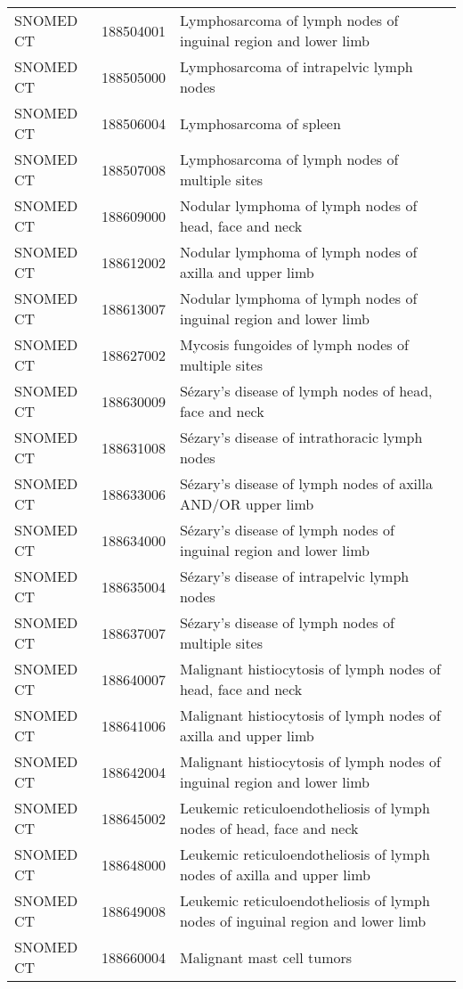 \begin{table}[ht]
\begin{tabular}{lll}
  SNOMED CT & 188504001 & Lymphosarcoma of lymph nodes of inguinal region and lower limb \\ 
  SNOMED CT & 188505000 & Lymphosarcoma of intrapelvic lymph nodes \\ 
  SNOMED CT & 188506004 & Lymphosarcoma of spleen \\ 
  SNOMED CT & 188507008 & Lymphosarcoma of lymph nodes of multiple sites \\ 
  SNOMED CT & 188609000 & Nodular lymphoma of lymph nodes of head, face and neck \\ 
  SNOMED CT & 188612002 & Nodular lymphoma of lymph nodes of axilla and upper limb \\ 
  SNOMED CT & 188613007 & Nodular lymphoma of lymph nodes of inguinal region and lower limb \\ 
  SNOMED CT & 188627002 & Mycosis fungoides of lymph nodes of multiple sites \\ 
  SNOMED CT & 188630009 & Sézary's disease of lymph nodes of head, face and neck \\ 
  SNOMED CT & 188631008 & Sézary's disease of intrathoracic lymph nodes \\ 
  SNOMED CT & 188633006 & Sézary's disease of lymph nodes of axilla AND/OR upper limb \\ 
  SNOMED CT & 188634000 & Sézary's disease of lymph nodes of inguinal region and lower limb \\ 
  SNOMED CT & 188635004 & Sézary's disease of intrapelvic lymph nodes \\ 
  SNOMED CT & 188637007 & Sézary's disease of lymph nodes of multiple sites \\ 
  SNOMED CT & 188640007 & Malignant histiocytosis of lymph nodes of head, face and neck \\ 
  SNOMED CT & 188641006 & Malignant histiocytosis of lymph nodes of axilla and upper limb \\ 
  SNOMED CT & 188642004 & Malignant histiocytosis of lymph nodes of inguinal region and lower limb \\ 
  SNOMED CT & 188645002 & Leukemic reticuloendotheliosis of lymph nodes of head, face and neck \\ 
  SNOMED CT & 188648000 & Leukemic reticuloendotheliosis of lymph nodes of axilla and upper limb \\ 
  SNOMED CT & 188649008 & Leukemic reticuloendotheliosis of lymph nodes of inguinal region and lower limb \\ 
  SNOMED CT & 188660004 & Malignant mast cell tumors \\ 

\end{tabular}
\end{table}
